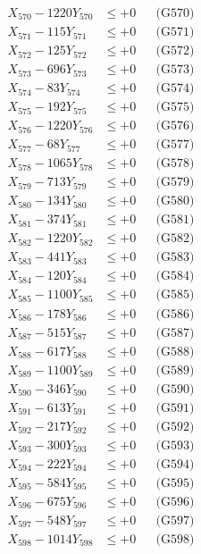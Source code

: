 \documentclass[a4paper,10pt]{article}
\begin{document}
{\begin{align}
X_{570} - 1220Y_{570} &\leq +0 && \text{(G570)} \\
\allowbreak
X_{571} - 115Y_{571} &\leq +0 && \text{(G571)} \\
X_{572} - 125Y_{572} &\leq +0 && \text{(G572)} \\
X_{573} - 696Y_{573} &\leq +0 && \text{(G573)} \\
X_{574} - 83Y_{574} &\leq +0 && \text{(G574)} \\
X_{575} - 192Y_{575} &\leq +0 && \text{(G575)} \\
X_{576} - 1220Y_{576} &\leq +0 && \text{(G576)} \\
X_{577} - 68Y_{577} &\leq +0 && \text{(G577)} \\
X_{578} - 1065Y_{578} &\leq +0 && \text{(G578)} \\
X_{579} - 713Y_{579} &\leq +0 && \text{(G579)} \\
X_{580} - 134Y_{580} &\leq +0 && \text{(G580)} \\
\allowbreak
X_{581} - 374Y_{581} &\leq +0 && \text{(G581)} \\
X_{582} - 1220Y_{582} &\leq +0 && \text{(G582)} \\
X_{583} - 441Y_{583} &\leq +0 && \text{(G583)} \\
X_{584} - 120Y_{584} &\leq +0 && \text{(G584)} \\
X_{585} - 1100Y_{585} &\leq +0 && \text{(G585)} \\
X_{586} - 178Y_{586} &\leq +0 && \text{(G586)} \\
X_{587} - 515Y_{587} &\leq +0 && \text{(G587)} \\
X_{588} - 617Y_{588} &\leq +0 && \text{(G588)} \\
X_{589} - 1100Y_{589} &\leq +0 && \text{(G589)} \\
X_{590} - 346Y_{590} &\leq +0 && \text{(G590)} \\
\allowbreak
X_{591} - 613Y_{591} &\leq +0 && \text{(G591)} \\
X_{592} - 217Y_{592} &\leq +0 && \text{(G592)} \\
X_{593} - 300Y_{593} &\leq +0 && \text{(G593)} \\
X_{594} - 222Y_{594} &\leq +0 && \text{(G594)} \\
X_{595} - 584Y_{595} &\leq +0 && \text{(G595)} \\
X_{596} - 675Y_{596} &\leq +0 && \text{(G596)} \\
X_{597} - 548Y_{597} &\leq +0 && \text{(G597)} \\
X_{598} - 1014Y_{598} &\leq +0 && \text{(G598)} \\

\end{align}}
\end{document}
